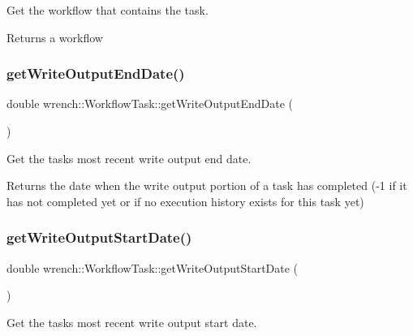 Get the workflow that contains the task. 

\begin{DoxyReturn}{Returns}
a workflow 
\end{DoxyReturn}
\mbox{\label{classwrench_1_1_workflow_task_aa9a538645c4946f7a257d66a80d45401}} 
\subsubsection{\texorpdfstring{get\+Write\+Output\+End\+Date()}{getWriteOutputEndDate()}}
{\footnotesize\ttfamily double wrench\+::\+Workflow\+Task\+::get\+Write\+Output\+End\+Date (\begin{DoxyParamCaption}{ }\end{DoxyParamCaption})}



Get the task\textquotesingle{}s most recent write output end date. 

\begin{DoxyReturn}{Returns}
the date when the write output portion of a task has completed (-\/1 if it has not completed yet or if no execution history exists for this task yet) 
\end{DoxyReturn}
\mbox{\label{classwrench_1_1_workflow_task_a2905c939f467778439fea8a956b0381b}} 
\subsubsection{\texorpdfstring{get\+Write\+Output\+Start\+Date()}{getWriteOutputStartDate()}}
{\footnotesize\ttfamily double wrench\+::\+Workflow\+Task\+::get\+Write\+Output\+Start\+Date (\begin{DoxyParamCaption}{ }\end{DoxyParamCaption})}



Get the task\textquotesingle{}s most recent write output start date. 

